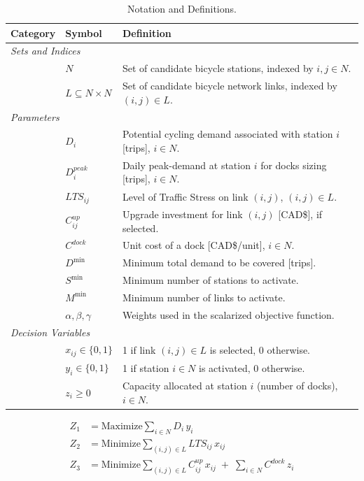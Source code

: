 \documentclass[preprint,authoryear,10pt]{elsarticle}
\begin{document}
\begin{table}[!ht]
\caption{Notation and Definitions.}
\label{tab:notation}
\centering
\small
\begin{tabularx}{0.85\textwidth}{@{} l l X @{}}
\hline
\textbf{Category} & \textbf{Symbol} & \textbf{Definition} \\
\hline

\multicolumn{3}{l}{\textit{Sets and Indices}} \\
& $N$ & Set of candidate bicycle stations, indexed by $i,j \in N$. \\
& $L \subseteq N \times N$ & Set of candidate bicycle network links, indexed by $(i,j)\in L$. \\
\hline

\multicolumn{3}{l}{\textit{Parameters}} \\
& $D_i$ & Potential cycling demand associated with station $i$ [trips], $i\in N$. \\
& $D_i^{peak}$ & Daily peak-demand at station $i$ for docks sizing [trips], $i\in N$. \\
& $LTS_{ij}$ & Level of Traffic Stress on link $(i,j)$, $(i,j)\in L$. \\
& $C_{ij}^{up}$ & Upgrade investment for link $(i,j)$ [CAD\$], if selected. \\
& $C^{dock}$ & Unit cost of a dock [CAD\$/unit], $i\in N$. \\
& $D^{\min}$ & Minimum total demand to be covered [trips]. \\
& $S^{\min}$ & Minimum number of stations to activate. \\
& $M^{\min}$ & Minimum number of links to activate. \\
& $\alpha,\beta,\gamma$ & Weights used in the scalarized objective function. \\
\hline

\multicolumn{3}{l}{\textit{Decision Variables}} \\
& $x_{ij}\in\{0,1\}$ & 1 if link $(i,j)\in L$ is selected, 0 otherwise. \\
& $y_i\in\{0,1\}$ & 1 if station $i\in N$ is activated, 0 otherwise. \\
& $z_i \ge 0$ & Capacity allocated at station $i$ (number of docks), $i\in N$. \\
\hline
\end{tabularx}
\end{table}


\begin{align}
\label{obj1_new}
Z_1 &= \text{Maximize} \sum_{i \in N} D_i\, y_i \\
\label{obj2_new}
Z_2 &= \text{Minimize} \sum_{(i,j) \in L} LTS_{ij}\, x_{ij} \\
\label{obj3_new}
Z_3 &= \text{Minimize} \sum_{(i,j)\in L} C_{ij}^{up}\, x_{ij} \;+\; \sum_{i\in N} C^{dock}\, z_i
\end{align}
\end{document}

